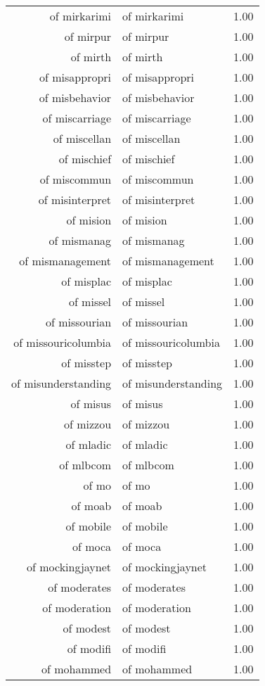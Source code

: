 \begin{table}[ht]
\begin{tabular}{rlr}
  of mirkarimi & of mirkarimi & 1.00 \\ 
  of mirpur & of mirpur & 1.00 \\ 
  of mirth & of mirth & 1.00 \\ 
  of misappropri & of misappropri & 1.00 \\ 
  of misbehavior & of misbehavior & 1.00 \\ 
  of miscarriage & of miscarriage & 1.00 \\ 
  of miscellan & of miscellan & 1.00 \\ 
  of mischief & of mischief & 1.00 \\ 
  of miscommun & of miscommun & 1.00 \\ 
  of misinterpret & of misinterpret & 1.00 \\ 
  of mision & of mision & 1.00 \\ 
  of mismanag & of mismanag & 1.00 \\ 
  of mismanagement & of mismanagement & 1.00 \\ 
  of misplac & of misplac & 1.00 \\ 
  of missel & of missel & 1.00 \\ 
  of missourian & of missourian & 1.00 \\ 
  of missouricolumbia & of missouricolumbia & 1.00 \\ 
  of misstep & of misstep & 1.00 \\ 
  of misunderstanding & of misunderstanding & 1.00 \\ 
  of misus & of misus & 1.00 \\ 
  of mizzou & of mizzou & 1.00 \\ 
  of mladic & of mladic & 1.00 \\ 
  of mlbcom & of mlbcom & 1.00 \\ 
  of mo & of mo & 1.00 \\ 
  of moab & of moab & 1.00 \\ 
  of mobile & of mobile & 1.00 \\ 
  of moca & of moca & 1.00 \\ 
  of mockingjaynet & of mockingjaynet & 1.00 \\ 
  of moderates & of moderates & 1.00 \\ 
  of moderation & of moderation & 1.00 \\ 
  of modest & of modest & 1.00 \\ 
  of modifi & of modifi & 1.00 \\ 
  of mohammed & of mohammed & 1.00 \\ 

\end{tabular}
\end{table}
